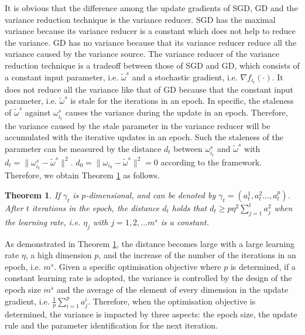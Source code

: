 \documentclass[letterpaper]{article}
\begin{document}
It is obvious that the difference among the update gradients of SGD, GD and the variance reduction technique is the variance reducer. SGD has the maximal variance because its variance reducer  is a constant which does not help to reduce the variance. GD has no variance because that its variance reducer reduce all the variance caused by the variance source. The variance reducer of the variance reduction technique is a tradeoff between those of SGD and GD, which consists of a constant input parameter, i.e. $\tilde{\omega}^s$ and a stochastic gradient, i.e. $\nabla f_{i_t}(\cdot)$. It does not reduce all the variance like that of GD because that the constant input parameter, i.e. $\tilde{\omega}^s$ is stale for the iterations in an epoch. In specific, the staleness of $\tilde{\omega}^s$ against $\omega_{i_t}^s$ causes the variance during the update in an epoch. Therefore, the variance caused by the stale parameter in the variance reducer will be accumulated with the iterative updates in an epoch.  
Such the staleness of the parameter can be measured by  the distance $d_t$ between $\omega_{i_t}^s$ and $\tilde{\omega}^s$ with $d_t = \parallel \omega_{i_t}^s - \tilde{\omega}^s \parallel^2$. $d_0 = \parallel \omega_{i_0}-\tilde{\omega}^s\parallel^2 = 0$ according to the framework. Therefore, we obtain Theorem \ref{theorem_vr_lower_bound} as follows.


\newtheorem{Theorem}{\bf{Theorem}}
\newtheorem{Lemma}{\bf{Lemma}}



\begin{Theorem}
\label{theorem_vr_lower_bound}
If $\gamma_t$ is $p$-dimensional, and can be denoted by  $\gamma_t = (a_t^1, a_t^2..., a_t^p)$.   After $t$ iterations in the epoch, the distance $d_t$ holds that $d_t \ge p \eta^2\sum\limits_{j=1}^t a_j^2$ when the learning rate, i.e. $\eta_j$ with $j=1,2, ...m^s$ is a constant.
\end{Theorem}

As demonstrated in Theorem \ref{theorem_vr_lower_bound}, the distance becomes large with a large learning rate $\eta$, a high dimension $p$, and the increase of the number of the iterations in an epoch, i.e. $m^s$. Given a specific optimisation objective where $p$ is determined, if a constant learning rate is adopted, the variance is controlled by the design of the epoch size $m^s$ and the average of the element of every dimension  in the update gradient, i.e.  $\frac{1}{p}\sum\limits_{i=1}^p a_j^i$.  Therefore,  when the optimisation objective is determined, the variance is impacted by three aspects: the epoch size, the update rule and the parameter identification for the next iteration.
\end{document}
